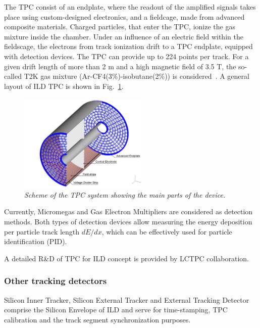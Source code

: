 The TPC consist of an endplate, where the readout of the amplified signals takes place using custom-designed electronics, and a fieldcage, made from advanced composite materials. 
Charged particles, that enter the TPC, ionize the gas mixture inside the chamber. Under an influence of an electric field within the fieldscage, the electrons from track ionization drift to a TPC endplate, equipped with detection devices. The TPC can provide up to 224 points per track.
For a given drift length of more than 2 m and a high magnetic field of 3.5 T, the so-called T2K gas mixture (Ar-CF4(3\%)-isobutane(2\%)) is considered~\cite{bib:ILC}.
A general layout of ILD TPC is shown in Fig.~\ref{fig:ILCtpc}. 
\begin{figure}
{\centering
    \includegraphics[width=0.55\textwidth]{graphics/ILCtpc.jpg}
    \caption{\sl Scheme of the TPC system showing the main parts of the device.}
    \label{fig:ILCtpc}
  }
\end{figure}

Currently, Micromegas and Gas Electron Multipliers are considered as detection methods. Both types of detection devices allow measuring the energy deposition per particle track length $dE/dx$, which can be effectively used for particle identification (PID).

A detailed R\&D of TPC for ILD concept is provided by LCTPC collaboration.

\subsubsection{Other tracking detectors}
Silicon Inner Tracker, Silicon External Tracker and External Tracking Detector comprise the Silicon Envelope of ILD and serve for time-stamping, TPC calibration and the track segment synchronization purposes. 


